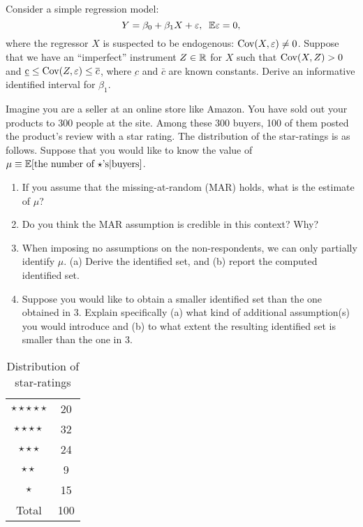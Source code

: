 \documentclass[11pt, A4paper, openany, uplatex]{book}
\begin{document}
\begin{framed}
\begin{exercise}\upshape
	Consider a simple regression model:
	\[
	Y = \beta_0 + \beta_1 X + \varepsilon, \;\; \mathbb{E} \varepsilon = 0,
	\]
	where the regressor $X$ is suspected to be endogenous: $\mathrm{Cov}(X, \varepsilon) \neq 0$.
	Suppose that we have an ``imperfect'' instrument $Z \in \mathbb{R}$ for $X$ such that $\mathrm{Cov}(X, Z) > 0$ and $\underbar c \le \mathrm{Cov}(Z,\varepsilon) \le \overline c$, where $\underbar c$ and $\bar c$ are known constants.
	Derive an informative identified interval for $\beta_1$.
\end{exercise}

\begin{exercise}\upshape
Imagine you are a seller at an online store like Amazon.
You have sold out your products to 300 people at the site.
Among these 300 buyers, 100 of them posted the product's review with a star rating.
The distribution of the star-ratings is as follows.
Suppose that you would like to know the value of $\mu \equiv \mathbb{E}[\text{the number of $\star$'s}|\text{buyers}]$.

\begin{enumerate}
	\item If you assume that the missing-at-random (MAR) holds, what is the estimate of $\mu$?
	\item Do you think the MAR assumption is credible in this context? Why?
	\item When imposing no assumptions on the non-respondents, we can only partially identify $\mu$.
	(a) Derive the identified set, and (b) report the computed identified set.
	\item Suppose you would like to obtain a smaller identified set than the one obtained in 3.
	Explain specifically (a) what kind of additional assumption(s) you would introduce and (b) to what extent the resulting identified set is smaller than the one in 3. 
\end{enumerate}
\end{exercise}
\end{framed}

\begin{table}[h]
	\caption{Distribution of star-ratings}
	\begin{center}
	\begin{tabular}{c|c}
	\hline
	$\star \star \star \star \star $ & 20 \\
	$\star \star \star \star $ & 32 \\
	$\star \star \star $ & 24 \\
	$\star \star $ & 9 \\
	$\star $ & 15 \\
	\hline
	Total & 100\\
	\hline
	\end{tabular}
	\end{center}
\end{table}
\end{document}
